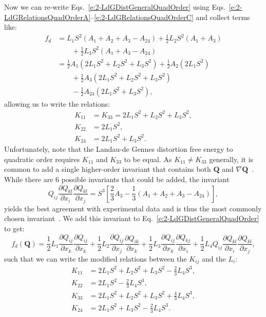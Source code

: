 Now we can re-write Eqs.~\ref{e:2-LdGDistGeneralQuadOrder} using Eqs.~\ref{e:2-LdGRelationsQuadOrderA}--\ref{e:2-LdGRelationsQuadOrderC} and collect terms like:
\begin{align}
  f_d &= L_1 S^2 (A_1 + A_2 + A_3 -A_{24}) + \frac{1}{2}L_2 S^2 (A_1 + A_3) \nonumber \\
  & \quad \quad + \frac{1}{2}L_3 S^2 (A_1 + A_3 - A_{24})\label{e:2-LdGRelationsSaddleSplayDegen} \\
      &= \frac{1}{2}A_1(2 L_1 S^2 + L_2 S^2 +L_3 S^2) + \frac{1}{2}A_2(2 L_1 S^2) \nonumber \\
      & \quad \quad + \frac{1}{2}A_3(2 L_1 S^2 + L_2 S^2 +L_3 S^2) \nonumber \\
      & \quad \quad - \frac{1}{2}A_{24}(2 L_1 S^2 + L_3 S^2),
\end{align}
allowing us to write the relations:
\begin{align}
  K_{11} &= K_{33} = 2 L_1 S^2 + L_2 S^2 +L_3 S^2,\\
  K_{22} &= 2 L_1 S^2,\\
  K_{24} &= 2 L_1 S^2 + L_3 S^2.
\end{align}
Unfortunately, note that the Landau-de Gennes distortion free energy to quadratic order requires $K_{11}$ and $K_{33}$ to be equal.
As $K_{11} \neq K_{33}$ generally, it is common to add a single higher-order invariant that contains both $\mathbf{Q}$ and $\nabla \mathbf{Q}$~\cite{RN189,RN198,RN190}.
While there are 6 possible invariants that could be added, the invariant
\begin{equation}
  Q_{ij}\frac{\partial Q_{kl}}{\partial x_i} \frac{\partial Q_{kl}}{\partial x_j} = S^3 \left [\frac{2}{3}A_3 - \frac{1}{3}(A_1+A_2+A_3-A_{24}) \right ],
\end{equation}
yields the best agreement with experimental data and is thus the most commonly chosen invariant~\cite{RN189,RN198,RN190}.
We add this invariant to Eq.~\ref{e:2-LdGDistGeneralQuadOrder} to get:
\begin{equation}
  f_d(\mathbf{Q}) = \frac{1}{2} L_1 \frac{\partial Q_{ij}}{\partial x_k} \frac{\partial Q_{ij}}{\partial x_k}
    + \frac{1}{2} L_2 \frac{\partial Q_{ij}}{\partial x_j} \frac{\partial Q_{ik}}{\partial x_k}
    + \frac{1}{2} L_3 \frac{\partial Q_{ij}}{\partial x_k} \frac{\partial Q_{kj}}{\partial x_i}
    + \frac{1}{2} L_4 Q_{ij}\frac{\partial Q_{kl}}{\partial x_i} \frac{\partial Q_{kl}}{\partial x_j},\label{e:2-LdGDistGeneralHighOrder}
\end{equation}
such that we can write the modified relations between the $K_{ij}$ and the $L_i$:
\begin{align}
  K_{11} &= 2 L_1 S^2 + L_2 S^2 +L_3 S^2 - \frac{2}{3}L_4 S^3,\label{e:2-LdGFrankRelationsA} \\
  K_{22} &= 2 L_1 S^2 - \frac{2}{3}L_4 S^3, \\
  K_{33} &= 2 L_1 S^2 + L_2 S^2 +L_3 S^2 + \frac{4}{3}L_4 S^3,\label{e:2-LdGFrankRelationsC}\\
  K_{24} &= 2 L_1 S^2 + L_3 S^2 - \frac{2}{3}L_4 S^3.\label{e:2-LdGFrankRelationsD}
\end{align}


